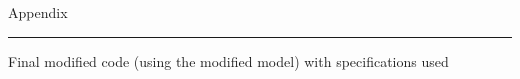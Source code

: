 \newpage
{\large Appendix}
\hrule
\label{appendix}

Final modified code (using the modified model) with specifications used



